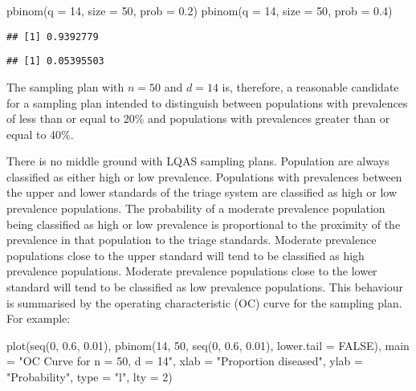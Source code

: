 \documentclass[
  12pt,
  a4paper]{book}
\newenvironment{Shaded}{\begin{snugshade}}{\end{snugshade}}
\newcommand{\AttributeTok}[1]{\textcolor[rgb]{0.77,0.63,0.00}{#1}}
\newcommand{\ConstantTok}[1]{\textcolor[rgb]{0.00,0.00,0.00}{#1}}
\newcommand{\DecValTok}[1]{\textcolor[rgb]{0.00,0.00,0.81}{#1}}
\newcommand{\FloatTok}[1]{\textcolor[rgb]{0.00,0.00,0.81}{#1}}
\newcommand{\FunctionTok}[1]{\textcolor[rgb]{0.00,0.00,0.00}{#1}}
\newcommand{\NormalTok}[1]{#1}
\newcommand{\StringTok}[1]{\textcolor[rgb]{0.31,0.60,0.02}{#1}}
\begin{document}
\begin{Shaded}
\begin{Highlighting}[]
\FunctionTok{pbinom}\NormalTok{(}\AttributeTok{q =} \DecValTok{14}\NormalTok{, }\AttributeTok{size =} \DecValTok{50}\NormalTok{, }\AttributeTok{prob =} \FloatTok{0.2}\NormalTok{)}
\FunctionTok{pbinom}\NormalTok{(}\AttributeTok{q =} \DecValTok{14}\NormalTok{, }\AttributeTok{size =} \DecValTok{50}\NormalTok{, }\AttributeTok{prob =} \FloatTok{0.4}\NormalTok{)}
\end{Highlighting}
\end{Shaded}

\begin{verbatim}
## [1] 0.9392779
\end{verbatim}

\begin{verbatim}
## [1] 0.05395503
\end{verbatim}

The sampling plan with \(n = 50\) and \(d = 14\) is, therefore, a reasonable candidate for a sampling plan intended to distinguish between populations with prevalences of less than or equal to 20\% and populations with prevalences greater than or equal to 40\%.

There is no middle ground with LQAS sampling plans. Population are always classified as either high or low prevalence. Populations with prevalences between the upper and lower standards of the triage system are classified as high or low prevalence populations. The probability of a moderate prevalence population being classified as high or low prevalence is proportional to the proximity of the prevalence in that population to the triage standards. Moderate prevalence populations close to the upper standard will tend to be classified as high prevalence populations. Moderate prevalence populations close to the lower standard will tend to be classified as low prevalence populations. This behaviour is summarised by the operating characteristic (OC) curve for the sampling plan. For example:

\begin{Shaded}
\begin{Highlighting}[]
\FunctionTok{plot}\NormalTok{(}\FunctionTok{seq}\NormalTok{(}\DecValTok{0}\NormalTok{, }\FloatTok{0.6}\NormalTok{, }\FloatTok{0.01}\NormalTok{),}
     \FunctionTok{pbinom}\NormalTok{(}\DecValTok{14}\NormalTok{, }\DecValTok{50}\NormalTok{, }\FunctionTok{seq}\NormalTok{(}\DecValTok{0}\NormalTok{, }\FloatTok{0.6}\NormalTok{, }\FloatTok{0.01}\NormalTok{), }\AttributeTok{lower.tail =} \ConstantTok{FALSE}\NormalTok{),}
     \AttributeTok{main =} \StringTok{"OC Curve for n = 50, d = 14"}\NormalTok{,}
     \AttributeTok{xlab =} \StringTok{"Proportion diseased"}\NormalTok{,}
     \AttributeTok{ylab =} \StringTok{"Probability"}\NormalTok{,}
     \AttributeTok{type =} \StringTok{"l"}\NormalTok{, }\AttributeTok{lty =} \DecValTok{2}\NormalTok{)}
\end{Highlighting}
\end{Shaded}
\end{document}
